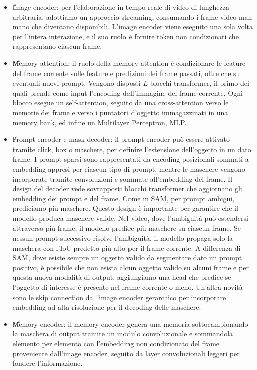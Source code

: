 \begin{itemize}
    \item \U{Image encoder}: per l'elaborazione in tempo reale di video di lunghezza arbitraria, adottiamo un approccio streaming, consumando i frame video man mano che diventano disponibili. L'image encoder viene eseguito una sola volta per l'intera interazione, e il suo ruolo è fornire token non condizionati che rappresentano ciascun frame.
    \item \U{Memory attention}: il ruolo della memory attention è condizionare le feature del frame corrente sulle feature e predizioni dei frame passati, oltre che su eventuali nuovi prompt. Vengono disposti $L$ blocchi transformer, il primo dei quali prende come input l'encoding dell'immagine del frame corrente. Ogni blocco esegue un self-attention, seguito da una cross-attention verso le memorie dei frame e verso i puntatori d'oggetto immagazzinati in una memory bank, ed infine un Multilayer Perceptron, MLP.
    \item \U{Prompt encoder e mask decoder}: il prompt encoder può essere attivato tramite click, box o maschere, per definire l'estensione dell'oggetto in un dato frame. I prompt sparsi sono rappresentati da encoding posizionali sommati a embedding appresi per ciascun tipo di prompt, mentre le maschere vengono incorporate tramite convoluzioni e sommate all'embedding del frame.
    Il design del decoder vede sovrapposti blocchi transformer  che aggiornano gli embedding dei prompt e del frame. Come in SAM, per prompt ambigui, prediciamo più maschere. Questo design è importante per garantire che il modello produca maschere valide. Nel video, dove l'ambiguità può estendersi attraverso più frame, il modello predice più maschere su ciascun frame. Se nessun prompt successivo risolve l'ambiguità, il modello propaga solo la maschera con l'IoU predetto più alto per il frame corrente.
    A differenza di SAM, dove esiste sempre un oggetto valido da segmentare dato un prompt positivo, è possibile che non esista alcun oggetto valido su alcuni frame e per questa nuova modalità di output, aggiungiamo una head che predice se l'oggetto di interesse è presente nel frame corrente o meno. Un'altra novità sono le skip connection dall'image encoder gerarchico per incorporare embedding ad alta risoluzione per il decoding delle maschere.
    \item \U{Memory encoder}: il memory encoder genera una memoria sottocampionando la maschera di output tramite un modulo convoluzionale e sommandola elemento per elemento con l'embedding non condizionato del frame proveniente dall'image encoder, seguito da layer convoluzionali leggeri per fondere l'informazione.

\end{itemize}
